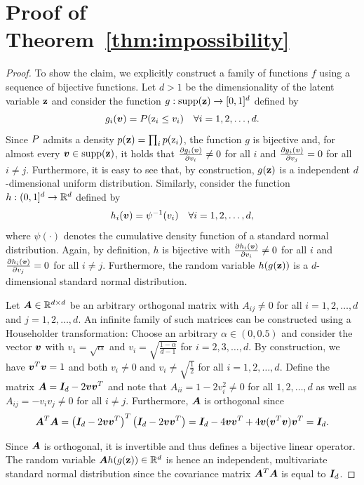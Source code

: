 \section{Proof of Theorem~\ref{thm:impossibility}}
\label{sec:proof}
\begin{proof}
To show the claim, we explicitly construct a family of functions $f$ using a sequence of bijective functions.
Let $d > 1$ be the dimensionality of the latent variable $\rvz$ and consider the function $g:\supp(\rvz)\to[0,1]^d$ defined by
\[
g_i(\vv) = \P(\rz_i\leq v_i) \quad \forall i =1, 2, \dots, d.
\]
Since $\P$ admits a density $p(\rvz)=\prod_ip(\rz_i)$, the function $g$ is bijective and, for almost every $\vv\in\supp(\rvz)$, it holds that $\frac{\partial g_i(\vv)}{\partial v_i}\neq 0$ for all $i$ and $\frac{\partial g_i(\vv)}{\partial v_j} = 0$ for all $i\neq j$.
Furthermore, it is easy to see that, by construction, $g(\rvz)$ is a independent $d$-dimensional uniform distribution.
Similarly, consider the function $h:(0,1]^d \to \R^d$ defined by
\[
h_i(\vv) = \psi^{-1}(v_i)\quad \forall i =1, 2, \dots, d,
\]
where $\psi(\cdot)$ denotes the cumulative density function of a standard normal distribution.
Again, by definition, $h$ is bijective with $\frac{\partial h_i(\vv)}{\partial v_i}\neq 0$ for all $i$ and $\frac{\partial h_i(\vv)}{\partial v_j} = 0$ for all $i \neq j$.
Furthermore, the random variable $h(g(\rvz))$ is a $d$-dimensional standard normal distribution.

Let $\mA\in\R^{d\times d}$ be an arbitrary orthogonal matrix with $A_{ij}\neq0$ for all $i=1,2, \dots, d$ and $j=1, 2, \dots, d$. 
An infinite family of such matrices can be constructed using a Householder transformation:
Choose an arbitrary $\alpha\in(0, 0.5)$ and consider the vector $\vv$ with $v_1=\sqrt{\alpha}$ and $v_i=\sqrt{\frac{1-\alpha}{d-1}}$ for $i=2, 3, \dots, d$. 
By construction, we have $\vv^T\vv = 1$ and both $v_i\neq0$ and $v_i\neq\sqrt{\frac12}$ for all $i=1, 2, \dots, d$.
Define the matrix $\mA = \mI_d - 2 \vv\vv^T$ and note that $A_{ii} = 1 - 2v_i^2 \neq 0$ for all $1,2, \dots, d$ as well as $A_{ij} = -v_iv_j\neq0$ for all $i\neq j$.
Furthermore, $\mA$ is orthogonal since 
\begin{align*}
\mA^T\mA = \left(\mI_d - 2 \vv\vv^T\right)^T\left(\mI_d - 2 \vv\vv^T\right) = \mI_d - 4 \vv\vv^T + 4 \vv(\vv^T\vv)\vv^T = \mI_d.
\end{align*}

Since $\mA$ is orthogonal, it is invertible and thus defines a bijective linear operator.
The random variable $\mA h(g(\rvz))\in\R^d$ is hence an independent, multivariate standard normal distribution since the covariance matrix $\mA^T\mA$ is equal to $\mI_d$.


\end{proof}

